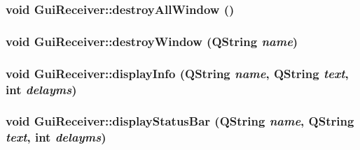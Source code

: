 \label{classGuiReceiver_a59873b996659d0bb92d09638902ec4dc}
\hypertarget{classGuiReceiver_a748313239bdf5a50cc877dd91b3c1950}{
\subsubsection[{destroyAllWindow}]{\setlength{\rightskip}{0pt plus 5cm}void GuiReceiver::destroyAllWindow ()}}
\label{classGuiReceiver_a748313239bdf5a50cc877dd91b3c1950}
\hypertarget{classGuiReceiver_a86942e372e278c27c98af1930d9b9e97}{
\subsubsection[{destroyWindow}]{\setlength{\rightskip}{0pt plus 5cm}void GuiReceiver::destroyWindow (QString {\em name})}}
\label{classGuiReceiver_a86942e372e278c27c98af1930d9b9e97}
\hypertarget{classGuiReceiver_a1e010c3db9ebaaf1efddb8c03f558e88}{
\subsubsection[{displayInfo}]{\setlength{\rightskip}{0pt plus 5cm}void GuiReceiver::displayInfo (QString {\em name}, \/  QString {\em text}, \/  int {\em delayms})}}
\label{classGuiReceiver_a1e010c3db9ebaaf1efddb8c03f558e88}
\hypertarget{classGuiReceiver_abfc7c7fb831a8c423a7a15e2b0ec994b}{
\subsubsection[{displayStatusBar}]{\setlength{\rightskip}{0pt plus 5cm}void GuiReceiver::displayStatusBar (QString {\em name}, \/  QString {\em text}, \/  int {\em delayms})}}
\label{classGuiReceiver_abfc7c7fb831a8c423a7a15e2b0ec994b}
